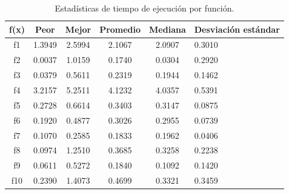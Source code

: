 \documentclass[12pt,twoside]{article}
\begin{document}
\begin{table}[h]
	\centering
	\begin{tabular}{|c|c|c|c|c|p{2.1cm}|}  
		\hline
		\textbf{f(x)} & \textbf{Peor} & \textbf{Mejor} & \textbf{Promedio} & \textbf{Mediana} & \textbf{Desviación estándar} \\  
		\hline
		f1 & 1.3949 & 2.5994 & 2.1067 & 2.0907 & 0.3010 \\
		f2 & 0.0037 & 1.0159 & 0.1740 & 0.0304 & 0.2920 \\
		f3 & 0.0379 & 0.5611 & 0.2319 & 0.1944 & 0.1462 \\
		f4 & 3.2157 & 5.2511 & 4.1232 & 4.0357 & 0.5391 \\
		f5 & 0.2728 & 0.6614 & 0.3403 & 0.3147 & 0.0875 \\
		f6 & 0.1920 & 0.4877 & 0.3026 & 0.2955 & 0.0739 \\
		f7 & 0.1070 & 0.2585 & 0.1833 & 0.1962 & 0.0406 \\
		f8 & 0.0974 & 1.2510 & 0.3685 & 0.3258 & 0.2238 \\
		f9 & 0.0611 & 0.5272 & 0.1840 & 0.1092 & 0.1420 \\
		f10 & 0.2390 & 1.4073 & 0.4699 & 0.3321 & 0.3459 \\
		\hline
	\end{tabular}
	\caption{Estadísticas de tiempo de ejecución por función.}
	\label{tab:tiempo}
\end{table}


	\clearpage
	
	
\end{document}
